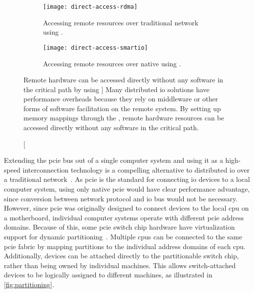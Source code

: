 \begin{figure}
    \centering
    \begin{subfigure}{\linewidth}
        \centering
        \texttt{[image: direct-access-rdma]}
        \caption{Accessing remote resources over traditional network using .}
    \end{subfigure}
    \par\vspace{5mm}
    \begin{subfigure}{\linewidth}
        \centering
        \texttt{[image: direct-access-smartio]}
        \caption{Accessing remote resources over native  using .}
    \end{subfigure}
    \caption
    [Remote hardware can be accessed directly without any software in the critical path by using ]
    {Many distributed \gls{io} solutions have performance overheads because they rely on \gls{middleware} or other forms of software facilitation on the remote system. By setting up memory mappings through the , remote hardware resources can be accessed directly without any software in the critical path.}
    \label{fig:direct-access}
\end{figure}



Extending the \gls{pcie} bus out of a single computer system and using it as a high-speed interconnection technology is a compelling alternative to distributed \gls{io} over a traditional network~\cite{whitepaper:Regula2004,Fountain2005,Ravindran2008}.
%
As \gls{pcie} is the standard for connecting \gls{io} devices to a local computer system, using only native \gls{pcie} would have clear performance advantage, since conversion between network protocol and \gls{io} bus would not be necessary.
%
However, since \gls{pcie} was originally designed to connect devices to the local \gls{cpu} on a motherboard, individual computer systems operate with different \gls{pcie} address domains.
%
Because of this, some \gls{pcie} switch chip hardware have virtualization support for dynamic partitioning~\cite{Chung2018,whitepaper:IDT,whitepaper:Microsemi}.
%
Multiple \glspl{cpu} can be connected to the same \gls{pcie} fabric by mapping partitions to the individual address domains of each \gls{cpu}.
%
Additionally, devices can be attached directly to the partitionable switch chip, rather than being owned by individual machines.
%
This allows switch-attached devices to be logically assigned to different machines, as illustrated in \cref{fig:partitioning}.



